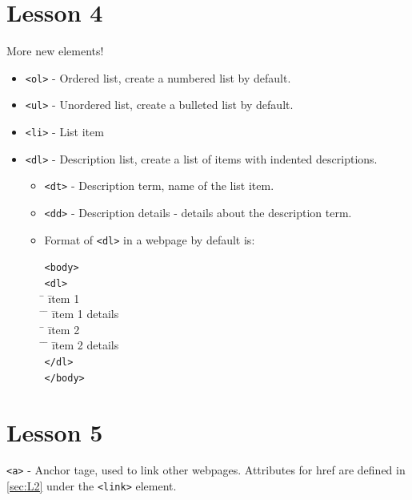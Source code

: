 \documentclass{article}
\begin{document}
\section{Lesson 4} \label{sec:L4}
More new elements!
\begin{itemize}
    \item \verb|<ol>| - Ordered list, create a numbered list by default.
    \item \verb|<ul>| - Unordered list, create a bulleted list by default.
    \item \verb|<li>| - List item
    \item \verb|<dl>| - Description list, create a list of items with indented descriptions.
    \begin{itemize}
        \item \verb|<dt>| - Description term, name of the list item.
        \item \verb|<dd>| - Description details - details about the description term.
        \item Format of \verb|<dl>| in a webpage by default is:
        \begin{tabbing}
            \verb|<body>| \\ 
            \hspace{1em} \= \verb|<dl>| \\
            \hspace{1em} \= \hspace{1em} \= item 1 \\
            \hspace{1em} \= \hspace{1em} \= \hspace{1em} \= item 1 details \\
            \hspace{1em} \= \hspace{1em} \= item 2 \\
            \hspace{1em} \= \hspace{1em} \= \hspace{1em} \= item 2 details \\
            \hspace{1em} \= \verb|</dl>| \\
            \verb|</body>|\\
        \end{tabbing}
    \end{itemize}
\end{itemize}

\section{Lesson 5} \label{sec:L5}
\verb|<a>| - Anchor tage, used to link other webpages. Attributes for href are defined in \ref{sec:L2} under the
\verb|<link>| element.
\end{document}
